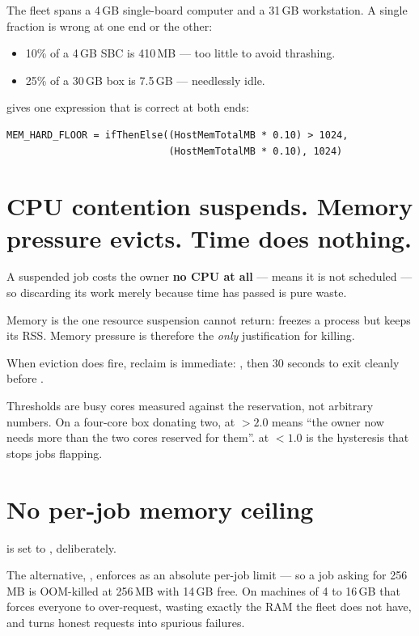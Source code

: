 The fleet spans a 4\,GB single-board computer and a 31\,GB workstation. A single
fraction is wrong at one end or the other:

\begin{itemize}
  \item 10\% of a 4\,GB SBC is 410\,MB --- too little to avoid thrashing.
  \item 25\% of a 30\,GB box is 7.5\,GB --- needlessly idle.
\end{itemize}

 gives one expression that is correct at both ends:

\begin{lstlisting}
MEM_HARD_FLOOR = ifThenElse((HostMemTotalMB * 0.10) > 1024,
                            (HostMemTotalMB * 0.10), 1024)
\end{lstlisting}

\section{CPU contention suspends. Memory pressure evicts. Time does nothing.}

\begin{keypoint}
A suspended job costs the owner \textbf{no CPU at all} ---  means it
is not scheduled --- so discarding its work merely because time has passed is
pure waste.

Memory is the one resource suspension cannot return:  freezes a
process but keeps its RSS. Memory pressure is therefore the \emph{only}
justification for killing.
\end{keypoint}

When eviction does fire, reclaim is immediate: ,
then 30 seconds to exit cleanly before .

Thresholds are busy cores measured against the reservation, not arbitrary
numbers. On a four-core box donating two,  at $>2.0$ means ``the
owner now needs more than the two cores reserved for them''.  at
$<1.0$ is the hysteresis that stops jobs flapping.

\section{No per-job memory ceiling}

 is set to , deliberately.

The alternative, , enforces  as an absolute per-job
limit --- so a job asking for 256\,MB is OOM-killed at 256\,MB with 14\,GB free.
On machines of 4 to 16\,GB that forces everyone to over-request, wasting exactly
the RAM the fleet does not have, and turns honest requests into spurious
failures.

